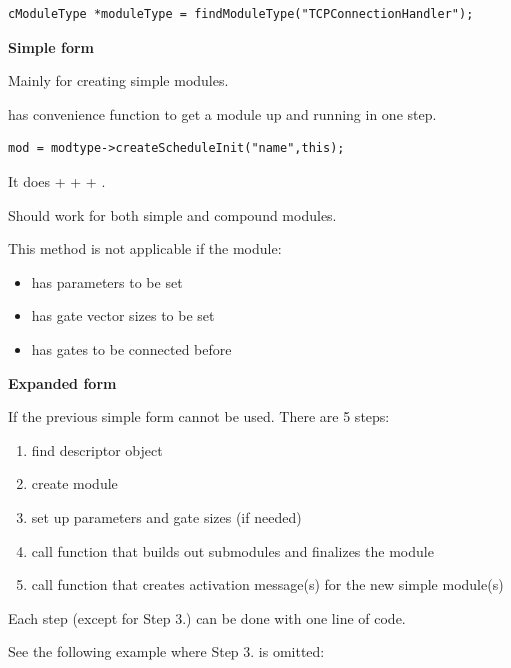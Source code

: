 %
%

\begin{verbatim}
cModuleType *moduleType = findModuleType("TCPConnectionHandler");
\end{verbatim}


\textbf{Simple form}


Mainly for creating simple modules.

%
%

 has
 convenience function to get a module up and
running in one step.

\begin{verbatim}
mod = modtype->createScheduleInit("name",this);
\end{verbatim}

It does  +  +  +
.


Should work for both simple and compound modules.

This method is not applicable if the module:
\begin{itemize}
  \item{has parameters to be set}
  \item{has gate vector sizes to be set}
  \item{has gates to be connected before }
\end{itemize}

%
%

\textbf{Expanded form}


If the previous simple form cannot be used. There are 5 steps:
\begin{enumerate}
  \item{find descriptor object}
  \item{create module}
  \item{set up parameters and gate sizes (if needed)}
  \item{call function that builds out submodules and finalizes the
    module}
  \item{call function that creates activation message(s) for the new
    simple module(s)}
\end{enumerate}
Each step (except for Step 3.) can be done with one line of code.



See the following example where Step 3. is omitted:

